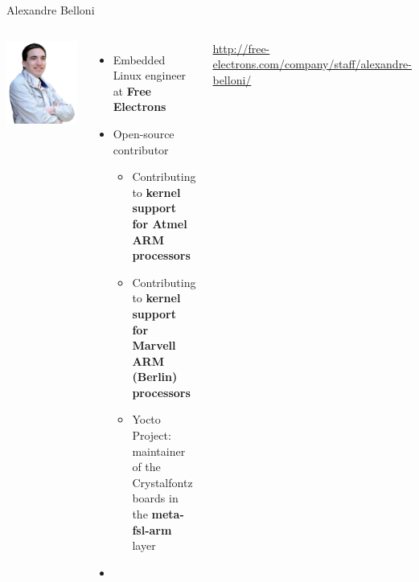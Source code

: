 \begin{frame}{Alexandre Belloni}
 \begin{columns}
    \includegraphics[width=\textwidth]{slides/first-slides/alexandre-belloni.jpg}
    \begin{itemize}
      \item Embedded Linux engineer at {\bf Free Electrons}
      \item Open-source contributor
        \begin{itemize}
          \item Contributing to {\bf kernel support for Atmel ARM
            processors}
          \item Contributing to {\bf kernel support for Marvell
            ARM (Berlin) processors}
          \item Yocto Project: maintainer of the Crystalfontz boards
            in the {\bf meta-fsl-arm} layer
        \end{itemize}
      \item {}
    \end{itemize}
    \url{http://free-electrons.com/company/staff/alexandre-belloni/}
 \end{columns}
\end{frame}

